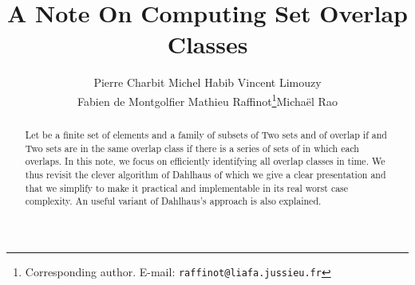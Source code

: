 \documentclass{llncs}
\begin{document}
  
  
  
\setcounter{algo}{0}  
\newenvironment{algo}[1]{\refstepcounter{algo}  
\begin{center}\sl Algorithm \thealgo: #1  
\begin{boxedminipage}{0.95\textwidth}  
}{\end{boxedminipage}\end{center}}

\newcommand{\mC}{\mathcal{C}}  
\newcommand{\mF}{\mathcal{F}}  





\newenvironment{preuve}{\noindent {\it Proof.}}{\vskip1ex}  
\newenvironment{preuveA1}{\noindent {\it Proof of conservation of   
Property .}}{\vskip1ex}  
\newenvironment{preuveA2}{\noindent {\it Proof of conservation of   
Property .}}{\vskip1ex}  
\newenvironment{preuveB}{\noindent {\it Proof of the invariants.}}  
{\vskip1ex}  
\newenvironment{OJO}{\noindent {\bf OJO:}}{\vskip1ex}  
  


\title{A Note On Computing Set Overlap Classes}    
  
 

\author{Pierre Charbit\quad
Michel Habib \quad
Vincent Limouzy\\
Fabien de Montgolfier\quad
Mathieu Raffinot\thanks{Corresponding author. E-mail: {\tt raffinot@liafa.jussieu.fr}}\quad Micha\"el Rao}

\maketitle 
  
  
\begin{abstract}
Let  be a finite set of  elements and  a family of  subsets of  Two sets
 and  of  overlap if   and  Two sets  are in the same overlap
class if there is a series  of sets of
 in which each  overlaps. In this note, we focus
on efficiently identifying all overlap classes in  time. We thus revisit the clever algorithm of Dahlhaus
\cite{Dahlhaus00} of which we give a clear presentation and that we
simplify to make it practical and implementable in its real worst case
complexity. An useful variant of Dahlhaus's approach is also explained.  
\end{abstract}  
  
\end{document}
